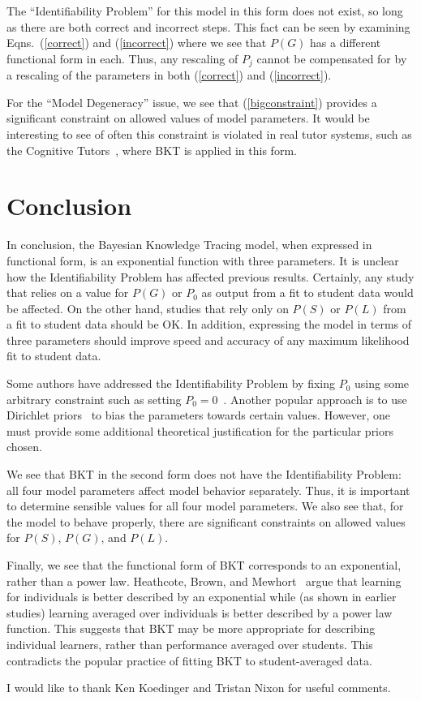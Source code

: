 \documentclass{acmlarge-edm}
\begin{document}
The ``Identifiability Problem'' for this model in this form
does not exist, so long as there are both correct and incorrect steps.
This fact can be seen by examining Eqns.~(\ref{correct}) and (\ref{incorrect})
where we see that $P(G)$ has a different functional form in each.
Thus, any rescaling of $P_j$ cannot be compensated for by a rescaling
of the parameters in both  (\ref{correct}) and (\ref{incorrect}).

For the ``Model Degeneracy'' issue, we see that (\ref{bigconstraint})
provides a significant constraint on allowed values of model parameters.
It would be interesting to see of often this constraint is 
violated in real tutor systems, such as the 
Cognitive Tutors~\cite{ritter_cognitive_2007}, 
where BKT is applied in this form.


\section{Conclusion}


In conclusion, the Bayesian Knowledge Tracing model, when expressed
in functional form, is an exponential function with three parameters.
It is unclear how the Identifiability Problem has affected previous
results.  Certainly, any study that relies on a value for $P(G)$ or
$P_0$ as output from a fit to student data would be affected.
On the other hand, studies that rely only on $P(S)$ or $P(L)$ from
a fit to student data should be OK.  In addition, expressing
the model in terms of three parameters should improve speed
and accuracy of any maximum likelihood fit to student data.

Some authors have addressed the Identifiability Problem by 
fixing $P_0$ using some arbitrary constraint such as setting
$P_0=0$~\cite{jose_gonzalez-brenes_dynamic_2012}. 
Another popular approach is to use Dirichlet 
priors~\cite{beck_identifiability:_2007} to bias the
parameters towards certain values.  However, one must provide
some additional theoretical justification for the
particular priors chosen.

We see that BKT in the second form does not have
the Identifiability Problem:  all four model parameters
affect model behavior separately.  Thus, it is important to determine
sensible values for all four model parameters.
We also see that, for the model to behave properly,  there are 
significant constraints on allowed values for $P(S)$, $P(G)$, and $P(L)$.

Finally, we see that the functional form of BKT corresponds 
to an exponential, rather than a power law.  
Heathcote, Brown, and Mewhort~\cite{heathcote_power_2000}
argue that learning for individuals is better described by an
exponential while (as shown in earlier studies) learning averaged
over individuals is better described by a power law function.
This suggests that BKT may be more appropriate for describing
individual learners, rather than performance averaged over students.
This contradicts the popular practice of fitting BKT to 
student-averaged data.

\begin{acks}
I would like to thank Ken Koedinger and Tristan Nixon for
useful comments.
\end{acks}


\end{document}
